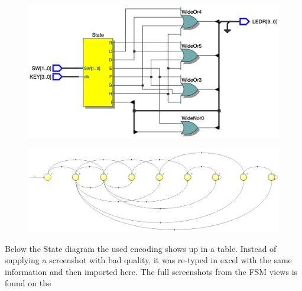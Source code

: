 \documentclass{article}
\begin{document}
\begin{figure}[h]
    \centering
    \includegraphics[width=1\textwidth]{Figures/Part2_RTL_TLE.jpg}
    \label{fig:p2_RTL_TLE}
\end{figure}
\hfill
\begin{figure}[h]
    \centering
    \includegraphics[width=1\textwidth]{Figures/StateSequential.jpg}
    \label{fig:p2_states}
\end{figure}

\clearpage
Below the State diagram the used encoding shows up in a table. Instead of supplying a screenshot with bad quality, it was re-typed in excel with the same information and then imported here. The full screenshots from the FSM views is found on the 
\end{document}
